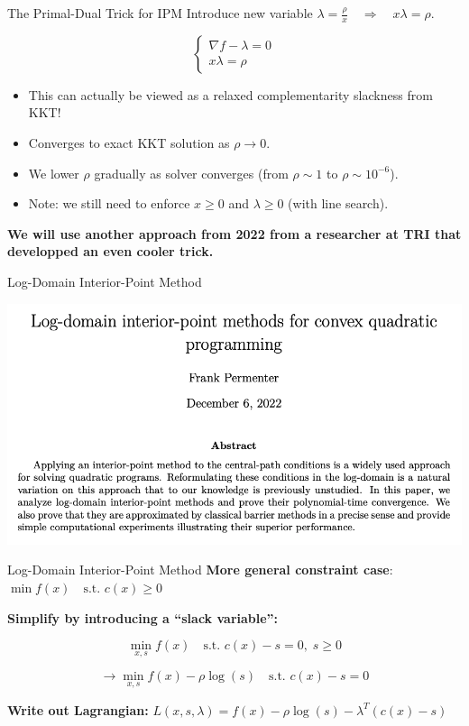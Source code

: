 \begin{frame}{The Primal-Dual Trick for IPM}
Introduce new variable $\lambda = \frac{\rho}{x} \quad \Rightarrow \quad x \lambda = \rho$.

$$
\begin{cases}
\nabla f - \lambda = 0 \\
x \lambda = \rho
\end{cases}
$$


\begin{itemize}
    \item This can actually be viewed as a relaxed complementarity slackness from KKT!
    \item Converges to exact KKT solution as $\rho \to 0$.
    \item We lower $\rho$ gradually as solver converges (from $\rho \sim 1$ to $\rho \sim 10^{-6}$).
    \item Note: we still need to enforce $x \geq 0$ and $\lambda \geq 0$ (with line search).
\end{itemize} 
\textbf{We will use another approach from 2022 from a researcher at TRI that developped an even cooler trick.}
    
\end{frame}

\begin{frame}{Log-Domain Interior-Point Method}
\begin{center}
    \includegraphics[scale=0.4]{figures/tri_paper.png}
\end{center}
\end{frame}


\begin{frame}{Log-Domain Interior-Point Method}
\textbf{More general constraint case}:   \quad \quad \quad \quad \quad  $\min f(x) \quad \text{s.t. } c(x) \geq 0$

\textbf{Simplify by introducing a “slack variable”:}

$$
\min_{x,s} f(x) \quad \text{s.t. } c(x) - s = 0, \; s \geq 0
$$

$$
\to \min_{x,s} f(x) - \rho \log(s)  \quad \text{s.t. } c(x) - s = 0
$$

\textbf{ Write out Lagrangian:} \quad \quad \quad $L(x,s,\lambda) = f(x) - \rho \log(s) - \lambda^T(c(x)-s)$  
\end{frame}


